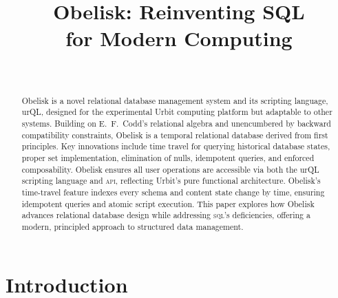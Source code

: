 \documentclass[twoside]{article}
\title{Obelisk:  Reinventing SQL \\ for Modern Computing}
\author{\authorname~\authorpatp \\ \affiliation}
\date{}
\begin{document}
\maketitle
\thispagestyle{firststyle}

\begin{abstract}
  \sloppy
  Obelisk is a novel relational database management system and its scripting language, urQL, designed for the experimental Urbit computing platform but adaptable to other systems. Building on E.\ F.\ Codd’s relational algebra and unencumbered by backward \mbox{compatibility} constraints, Obelisk is a temporal relational database derived from first principles. Key innovations include time travel for querying \mbox{historical} database states, proper set implementation, elimination of nulls, idempotent queries, and enforced composability. Obelisk ensures all user operations are accessible via both the urQL scripting language and \textsc{api}, reflecting \mbox{Urbit’s} pure \mbox{functional} architecture. Obelisk’s time-travel feature indexes every schema and content state change by time, ensuring idempotent queries and atomic script execution. This paper explores how Obelisk advances relational database design while \mbox{addressing} \textsc{sql}’s deficiencies, offering a modern, \mbox{principled} approach to structured data management.
\end{abstract}

\setcounter{page}{103}

\tableofcontents

\section{Introduction}
\end{document}
